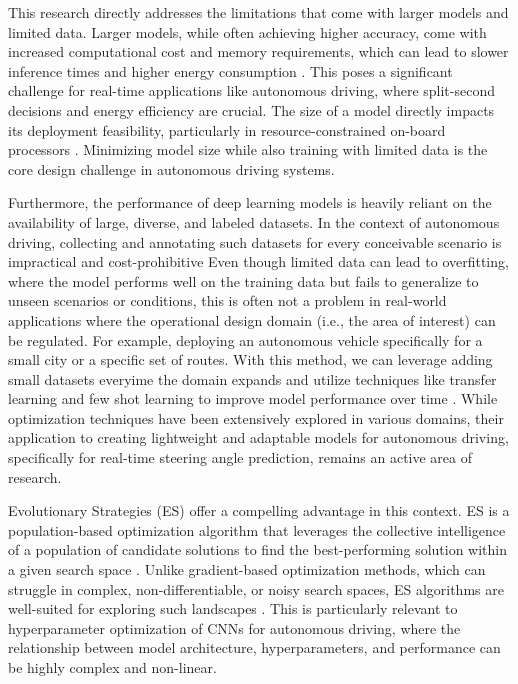 \documentclass[conference]{IEEEtran}
\begin{document}
This research directly addresses the limitations that come with larger models and limited data. Larger models, while often achieving higher accuracy, come with increased computational cost and memory requirements, which can lead to slower inference times and higher energy consumption \cite{self_drive_latency_and_model_size_drawbacks}. This poses a significant challenge for real-time applications like autonomous driving, where split-second decisions and energy efficiency are crucial. The size of a model directly impacts its deployment feasibility, particularly in resource-constrained on-board processors \cite{MobileNET_size_and_speed}. Minimizing model size while also training with limited data is the core design challenge in autonomous driving systems.

Furthermore, the performance of deep learning models is heavily reliant on the availability of large, diverse, and labeled datasets. In the context of autonomous driving, collecting and annotating such datasets for every conceivable scenario is impractical and cost-prohibitive \cite{ImageNET_large_scale_database} Even though limited data can lead to overfitting, where the model performs well on the training data but fails to generalize to unseen scenarios or conditions, this is often not a problem in real-world applications where the operational design domain (i.e., the area of interest) can be regulated. For example, deploying an autonomous vehicle specifically for a small city or a specific set of routes. With this method, we can leverage adding small datasets everyime the domain expands and utilize techniques like transfer learning and few shot learning to improve model performance over time \cite{few_shot_learning}. While optimization techniques have been extensively explored in various domains, their application to creating lightweight and adaptable models for autonomous driving, specifically for real-time steering angle prediction, remains an active area of research.

Evolutionary Strategies (ES) offer a compelling advantage in this context. ES is a population-based optimization algorithm that leverages the collective intelligence of a population of candidate solutions to find the best-performing solution within a given search space \cite{ES_introduction}. Unlike gradient-based optimization methods, which can struggle in complex, non-differentiable, or noisy search spaces, ES algorithms are well-suited for exploring such landscapes \cite{ES_scalable}. This is particularly relevant to hyperparameter optimization of CNNs for autonomous driving, where the relationship between model architecture, hyperparameters, and performance can be highly complex and non-linear.
\end{document}
